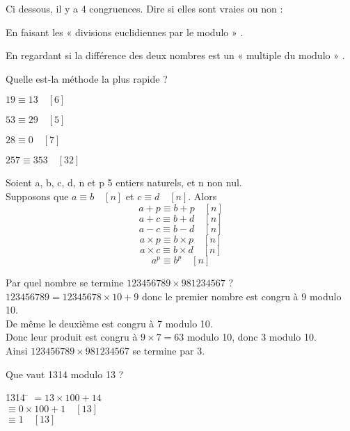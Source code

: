 \begin{exercice}[]
	Ci dessous, il y a 4 congruences. Dire si elles sont vraies ou non :
	
	\begin{enumalph}
		\item 	En faisant les  «  divisions euclidiennes par le modulo » .
		\item 	En regardant si la différence des deux nombres est un  «  multiple du modulo  » .
	\end{enumalph}
	Quelle est-la méthode la plus rapide ?
	
	\begin{multicols}{2}
		\begin{enumalph}
			\item $19\equiv 13\quad[6]$
			\item $53\equiv 29\quad[5]$
			\item $28\equiv 0 \quad[7]$
			\item $257\equiv 353\quad[32]$
		\end{enumalph}
	\end{multicols}
	
\end{exercice}


\begin{propriete}
	
	Soient a, b, c, d, n et p 5 entiers naturels, et n non nul.\\
	
	Supposons que $a\equiv b\quad[n]$ et $c\equiv d \quad [n]$. Alors
	$$ a+p \equiv b +p \quad [n]$$
	$$ a+c \equiv b + d \quad [n]$$
	$$ a-c \equiv b - d \quad [n]$$
	$$ a\times p \equiv b \times p \quad [n]$$
	$$ a\times c \equiv b \times d \quad [n]$$
	$$ a^p \equiv b^p \quad [n]$$
\end{propriete}

\begin{exemple}[s]
	\begin{enumalph}
		\item 		Par quel nombre se termine $123456789\times 981234567$ ?\\
		$123456789=12345678\times 10 +9$ donc le premier nombre est congru à 9 modulo 10.\\
		De même le deuxième est congru à 7 modulo 10.\\
		Donc leur produit est congru à $9\times7=63$ modulo 10, donc 3 modulo 10.\\
		Ainsi $123456789\times 981234567$ se termine par 3.
		\item 	Que vaut 1314 modulo 13 ?\\
		\begin{tabbing}
			1314 	\= $=13\times 100 +14$\\
			\> $\equiv 0\times 100 +1\quad[13]$\\
			\> $\equiv 1\quad [13]$
		\end{tabbing}
	\end{enumalph}
\end{exemple}



